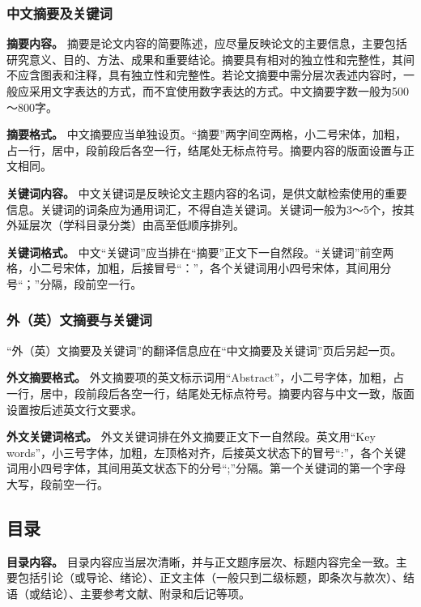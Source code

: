 \documentclass[singlesided]{Style/ucasthesis}%
\begin{document}
\hypertarget{section-15}{%
\subsubsection{中文摘要及关键词}\label{section-15}}

\textbf{摘要内容。} 摘要是论文内容的简要陈述，应尽量反映论文的主要信息，主要包括研究意义、目的、方法、成果和重要结论。摘要具有相对的独立性和完整性，其间不应含图表和注释，具有独立性和完整性。若论文摘要中需分层次表述内容时，一般应采用文字表达的方式，而不宜使用数字表达的方式。中文摘要字数一般为500～800字。

\textbf{摘要格式。} 中文摘要应当单独设页。``摘要''两字间空两格，小二号宋体，加粗，占一行，居中，段前段后各空一行，结尾处无标点符号。摘要内容的版面设置与正文相同。

\textbf{关键词内容。} 中文关键词是反映论文主题内容的名词，是供文献检索使用的重要信息。关键词的词条应为通用词汇，不得自造关键词。关键词一般为3～5个，按其外延层次（学科目录分类）由高至低顺序排列。

\textbf{关键词格式。} 中文``关键词''应当排在``摘要''正文下一自然段。``关键词''前空两格，小二号宋体，加粗，后接冒号``：''，各个关键词用小四号宋体，其间用分号``；''分隔，段前空一行。

\hypertarget{section-16}{%
\subsubsection{外（英）文摘要与关键词}\label{section-16}}

``外（英）文摘要及关键词''的翻译信息应在``中文摘要及关键词''页后另起一页。

\textbf{外文摘要格式。} 外文摘要项的英文标示词用``Abstract''，小二号字体，加粗，占一行，居中，段前段后各空一行，结尾处无标点符号。摘要内容与中文一致，版面设置按后述英文行文要求。

\textbf{外文关键词格式。} 外文关键词排在外文摘要正文下一自然段。英文用``Key words''，小三号字体，加粗，左顶格对齐，后接英文状态下的冒号``:''，各个关键词用小四号字体，其间用英文状态下的分号``;''分隔。第一个关键词的第一个字母大写，段前空一行。

\hypertarget{section-17}{%
\subsection{目录}\label{section-17}}

\textbf{目录内容。} 目录内容应当层次清晰，并与正文题序层次、标题内容完全一致。主要包括引论（或导论、绪论）、正文主体（一般只到二级标题，即条次与款次）、结语（或结论）、主要参考文献、附录和后记等项。
\end{document}
